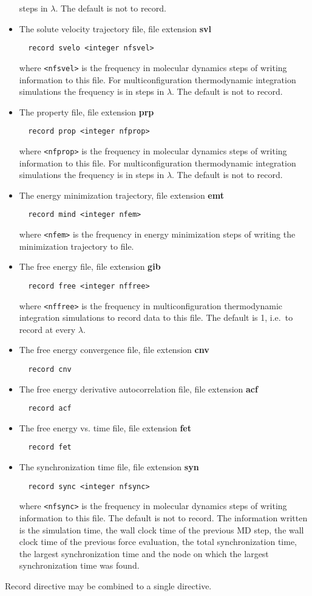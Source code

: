 \begin{itemize}
steps in $\lambda$. The default is not to record.
\item
The solute velocity trajectory file, file extension {\bf svl}
\begin{verbatim}
  record svelo <integer nfsvel>
\end{verbatim}
where \verb+<nfsvel>+ is the frequency in molecular dynamics steps
of writing information to this file. For multiconfiguration
thermodynamic integration simulations the frequency is in
steps in $\lambda$. The default is not to record.
\item
The property file, file extension {\bf prp}
\begin{verbatim}
  record prop <integer nfprop>
\end{verbatim}
where \verb+<nfprop>+ is the frequency in molecular dynamics steps
of writing information to this file. For multiconfiguration
thermodynamic integration simulations the frequency is in
steps in $\lambda$. The default is not to record.
\item
The energy minimization trajectory, file extension {\bf emt}
\begin{verbatim}
  record mind <integer nfem>
\end{verbatim}
where \verb+<nfem>+ is the frequency in energy minimization steps of
writing the minimization trajectory to file.
\item
The free energy file, file extension {\bf gib}
\begin{verbatim}
  record free <integer nffree>
\end{verbatim}
where \verb+<nffree>+ is the frequency in multiconfiguration
thermodynamic integration simulations to record data to this file.
The default is 1, i.e.\ to record at every $\lambda$.
\item
The free energy convergence file, file extension {\bf cnv}
\begin{verbatim}
  record cnv
\end{verbatim}
\item
The free energy derivative autocorrelation file, file extension {\bf acf}
\begin{verbatim}
  record acf
\end{verbatim}
\item
The free energy vs. time file, file extension {\bf fet}
\begin{verbatim}
  record fet
\end{verbatim}
\item
The synchronization time file, file extension {\bf syn}
\begin{verbatim}
  record sync <integer nfsync>
\end{verbatim}
where \verb+<nfsync>+ is the frequency in molecular dynamics steps
of writing information to this file. The default is not to record.
The information written is the simulation time, the wall clock time
of the previous MD step, the wall clock time of the previous force
evaluation, the total synchronization time, the largest
synchronization time and the node on which the largest synchronization
time was found.
\end{itemize}
Record directive may be combined to a single directive.


